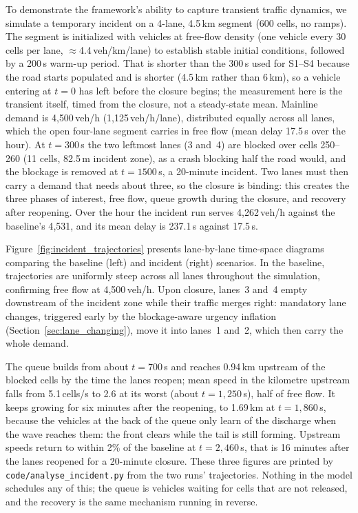 \documentclass[review,authoryear]{elsarticle}
\begin{document}
To demonstrate the framework's ability to capture transient traffic dynamics, we simulate a temporary incident on a 4-lane, 4.5\,km segment (600 cells, no ramps). The segment is initialized with vehicles at free-flow density (one vehicle every 30 cells per lane, $\approx$4.4\,veh/km/lane) to establish stable initial conditions, followed by a 200\,s warm-up period. That is shorter than the 300\,s used for S1--S4 because the road starts populated and is shorter (4.5\,km rather than 6\,km), so a vehicle entering at $t = 0$ has left before the closure begins; the measurement here is the transient itself, timed from the closure, not a steady-state mean. Mainline demand is 4{,}500\,veh/h (1{,}125\,veh/h/lane), distributed equally across all lanes, which the open four-lane segment carries in free flow (mean delay 17.5\,s over the hour). At $t = 300$\,s the two leftmost lanes (3 and~4) are blocked over cells 250--260 (11 cells, 82.5\,m incident zone), as a crash blocking half the road would, and the blockage is removed at $t = 1500$\,s, a 20-minute incident. Two lanes must then carry a demand that needs about three, so the closure is binding: this creates the three phases of interest, free flow, queue growth during the closure, and recovery after reopening. Over the hour the incident run serves 4{,}262\,veh/h against the baseline's 4{,}531, and its mean delay is 237.1\,s against 17.5\,s.

Figure~\ref{fig:incident_trajectories} presents lane-by-lane time-space diagrams comparing the baseline (left) and incident (right) scenarios. In the baseline, trajectories are uniformly steep across all lanes throughout the simulation, confirming free flow at 4{,}500\,veh/h. Upon closure, lanes~3 and~4 empty downstream of the incident zone while their traffic merges right: mandatory lane changes, triggered early by the blockage-aware urgency inflation (Section~\ref{sec:lane_changing}), move it into lanes~1 and~2, which then carry the whole demand.

The queue builds from about $t = 700$\,s and reaches 0.94\,km upstream of the blocked cells by the time the lanes reopen; mean speed in the kilometre upstream falls from 5.1\,cells/s to 2.6 at its worst (about $t = 1{,}250$\,s), half of free flow. It keeps growing for six minutes after the reopening, to 1.69\,km at $t = 1{,}860$\,s, because the vehicles at the back of the queue only learn of the discharge when the wave reaches them: the front clears while the tail is still forming. Upstream speeds return to within 2\% of the baseline at $t = 2{,}460$\,s, that is 16 minutes after the lanes reopened for a 20-minute closure. These three figures are printed by \texttt{code/analyse\_incident.py} from the two runs' trajectories. Nothing in the model schedules any of this; the queue is vehicles waiting for cells that are not released, and the recovery is the same mechanism running in reverse.
\end{document}
